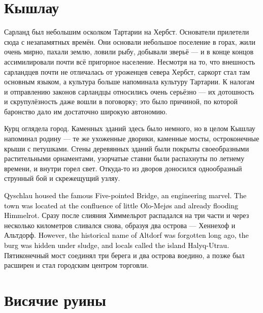 \documentclass[a4paper,10pt,fleqn]{book}\usepackage{polyglossia}\setdefaultlanguage{english}\setotherlanguage{russian}\defaultfontfeatures{Ligatures=TeX,Mapping=tex-text}\usepackage{xcolor}\definecolor{lightgray}{HTML}{bbbbbb}\color{lightgray}\newcommand{\ml}[3]{\textcolor{black}{#3}}
\begin{document}
\section{Кышлау}

Сарланд был небольшим осколком Тартарии на Хербст.
Основатели прилетели сюда с незапамятных времён.
Они основали небольшое поселение в горах, жили очень мирно, пахали землю, ловили рыбу, добывали зверьё --- и в конце концов ассимилировали почти всё пригорное население.
Несмотря на то, что внешность сарландцев почти не отличалась от уроженцев севера Хербст, саркорт стал там основным языком, а культура больше напоминала культуру Тартарии.
К налогам и отправлению законов сарландцы относились очень серьёзно --- их дотошность и скрупулёзность даже вошли в поговорку;
это было причиной, по которой баронство дало им достаточно широкую автономию.

Курц оглядела город.
Каменных зданий здесь было немного, но в целом Кышлау напоминал родину --- те же ухоженные дворики, каменные мосты, остроконечные крыши с петушками.
Стены деревянных зданий были покрыты своеобразными растительными орнаментами, узорчатые ставни были распахнуты по летнему времени, и внутри горел свет.
Откуда-то из дворов доносился однообразный струнный бой и скрежещущий узляу.

\ml{$0$}
{В Кышлау находился знаменитый Пятиконечный мост --- чудо инженерного искусства.}
{Qyschlau housed the famous Five-pointed Bridge, an engineering marvel.}
\ml{$0$}
{Город находился в месте слияния маленького Оло-Мейяса и успевшего стать полноводным Химмельрота.}
{The town was located at the confluence of little Olo-Mej\o{}s and already flooding Himmelrot.}
Сразу после слияния Химмельрот распадался на три части и через несколько километров сливался снова, образуя два острова --- Хеннехоф и Альтдорф.
\ml{$0$}
{Впрочем, историческое название Альтдорфа давно забыли, городище скрылось под слоем ила, и местные называли его Хазлык-Утрау.}
{However, the historical name of Altdorf was forgotten long ago, the burg was hidden under sludge, and locals called the island Ha\dh{}lyq-Utrau.}
Пятиконечный мост соединял три берега и два острова воедино, а позже был расширен и стал городским центром торговли.

\section{Висячие руины}
\end{document}
